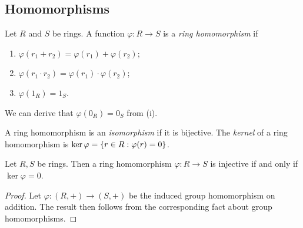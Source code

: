 \subsection{Homomorphisms}
\begin{definition}
	Let \( R \) and \( S \) be rings.
	A function \( \varphi \colon R \to S \) is a \textit{ring homomorphism} if
	\begin{enumerate}
		\item \( \varphi(r_1 + r_2) = \varphi(r_1) + \varphi(r_2) \);
		\item \( \varphi(r_1 \cdot r_2) = \varphi(r_1) \cdot \varphi(r_2) \);
		\item \( \varphi(1_R) = 1_S \).
	\end{enumerate}
	We can derive that \( \varphi(0_R) = 0_S \) from (i).

	A ring homomorphism is an \textit{isomorphism} if it is bijective.
	The \textit{kernel} of a ring homomorphism is \( \ker \varphi = \qty{r \in R : \varphi(r) = 0} \).
\end{definition}
\begin{lemma}
	Let \( R, S \) be rings.
	Then a ring homomorphism \( \varphi \colon R \to S \) is injective if and only if \( \ker \varphi = \qty{0} \).
\end{lemma}
\begin{proof}
	Let \( \varphi \colon (R, +) \to (S, +) \) be the induced group homomorphism on addition.
	The result then follows from the corresponding fact about group homomorphisms.
\end{proof}

